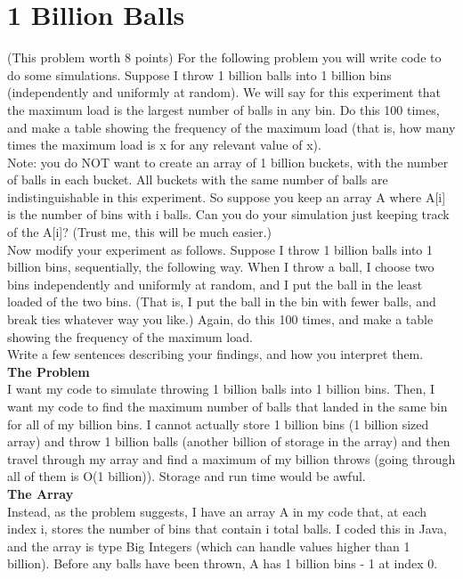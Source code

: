 \documentclass[11pt, solution, letterpaper]{format}
\begin{document}
\clearpage
\section{1 Billion Balls}
(This problem worth 8 points) For the following problem you will write code to do some simulations. Suppose
I throw 1 billion balls into 1 billion bins (independently and uniformly at random). We will say for this experiment that the maximum load is the largest number of balls in any bin. Do this 100 times, and make a
table showing the frequency of the maximum load (that is, how many times the maximum load is x for any
relevant value of x).\\

Note: you do NOT want to create an array of 1 billion buckets, with the number of balls in each bucket. All
buckets with the same number of balls are indistinguishable in this experiment. So suppose you keep an array
A where A[i] is the number of bins with i balls. Can you do your simulation just keeping track of the A[i]?
(Trust me, this will be much easier.)\\

Now modify your experiment as follows. Suppose I throw 1 billion balls into 1 billion bins, sequentially,
the following way. When I throw a ball, I choose two bins independently and uniformly at random, and I put
the ball in the least loaded of the two bins. (That is, I put the ball in the bin with fewer balls, and break ties
whatever way you like.) Again, do this 100 times, and make a table showing the frequency of the maximum
load.\\

Write a few sentences describing your findings, and how you interpret them.\\

\textbf{The Problem}\\
I want my code to simulate throwing 1 billion balls into 1 billion bins. Then, I want my code to find the maximum number of balls that landed in the same bin for all of my billion bins. I cannot actually store 1 billion bins (1 billion sized array) and throw 1 billion balls (another billion of storage in the array) and then travel through my array and find a maximum of my billion throws (going through all of them is O(1 billion)). Storage and run time would be awful.\\

\textbf{The Array}\\
Instead, as the problem suggests, I have an array A in my code that, at each index i, stores the number of bins that contain i total balls. I coded this in Java, and the array is type Big Integers (which can handle values higher than 1 billion). Before any balls have been thrown, A has 1 billion bins - 1 at index 0.\\
\end{document}
